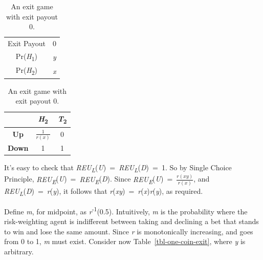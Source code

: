\documentclass[
  12pt,
  letterpaper,
  DIV=11,
  numbers=noendperiod]{scrreprt}
\begin{document}
\begin{table}

\caption{\label{tbl-zero-coin-exit}An exit game with exit payout
0.}\begin{minipage}[t]{0.50\linewidth}

{\centering 

\begin{tabular}[t]{cc}
\toprule
Exit Payout & 0\\
Pr(\emph{H}\textsubscript{1}) & \emph{y}\\
Pr(\emph{H}\textsubscript{2}) & \emph{x}\\
\bottomrule
\end{tabular}

}

\end{minipage}%
%
\begin{minipage}[t]{0.50\linewidth}

{\centering 

\begin{tabular}[t]{ccc}
\toprule
 & \textbf{\emph{H}}\textsubscript{\textbf{2}} & \textbf{\emph{T}}\textsubscript{\textbf{2}}\\
\midrule
\textbf{Up} & \(\frac{1}{r(x)}\) & 0\\
\textbf{Down} & 1 & 1\\
\bottomrule
\end{tabular}

}

\end{minipage}%

\end{table}

It's easy to check that
\emph{REU\textsubscript{L}}(\emph{U})~=~\emph{REU\textsubscript{L}}(\emph{D})~=~1.
So by Single Choice Principle,
\emph{REU\textsubscript{E}}(\emph{U})~=~\emph{REU\textsubscript{E}}(\emph{D}).
Since \emph{REU\textsubscript{E}}(\emph{U})~=~\(\frac{r(xy)}{r(x)}\),
and \emph{REU\textsubscript{L}}(\emph{D})~=~\emph{r}(\emph{y}), it
follows that \emph{r}(\emph{xy})~=~\emph{r}(\emph{x})\emph{r}(\emph{y}),
as required.

Define \emph{m}, for midpoint, as \emph{r}\textsuperscript{-1}(0.5).
Intuitively, \emph{m} is the probability where the risk-weighting agent
is indifferent between taking and declining a bet that stands to win and
lose the same amount. Since \emph{r} is monotonically increasing, and
goes from 0 to 1, \emph{m} must exist. Consider now
Table~\ref{tbl-one-coin-exit}, where \emph{y} is arbitrary.
\end{document}
